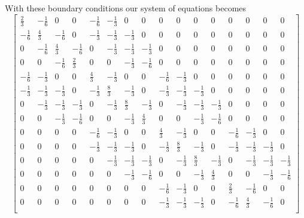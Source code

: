With these boundary conditions our system of equations becomes
\begin{equation}
  \begin{bmatrix}
  \frac{2}{3} & -\frac{1}{6} & 0 & 0 & -\frac{1}{6} & -\frac{1}{3} & 0 & 0 & 0 & 0 & 0 & 0 & 0 & 0 & 0 & 0 \\
  -\frac{1}{6} & \frac{4}{3} & -\frac{1}{6} & 0 & -\frac{1}{3} & -\frac{1}{3} & -\frac{1}{3} & 0 & 0 & 0 & 0 & 0 & 0 & 0 & 0 & 0 \\
  0 & -\frac{1}{6} & \frac{4}{3} & -\frac{1}{6} & 0 & -\frac{1}{3} & -\frac{1}{3} & -\frac{1}{3} & 0 & 0 & 0 & 0 & 0 & 0 & 0 & 0 \\
  0 & 0 & -\frac{1}{6} & \frac{2}{3} & 0 & 0 & -\frac{1}{3} & -\frac{1}{6} & 0 & 0 & 0 & 0 & 0 & 0 & 0 & 0 \\
  -\frac{1}{6} & -\frac{1}{3} & 0 & 0 & \frac{4}{3} & -\frac{1}{3} & 0 & 0 & -\frac{1}{6} & -\frac{1}{3} & 0 & 0 & 0 & 0 & 0 & 0 \\
  -\frac{1}{3} & -\frac{1}{3} & -\frac{1}{3} & 0 & -\frac{1}{3} & \frac{8}{3} & -\frac{1}{3} & 0 & -\frac{1}{3} & -\frac{1}{3} & -\frac{1}{3} & 0 & 0 & 0 & 0 & 0 \\
  0 & -\frac{1}{3} & -\frac{1}{3} & -\frac{1}{3} & 0 & -\frac{1}{3} & \frac{8}{3} & -\frac{1}{3} & 0 & -\frac{1}{3} & -\frac{1}{3} & -\frac{1}{3} & 0 & 0 & 0 & 0 \\
  0 & 0 & -\frac{1}{3} & -\frac{1}{6} & 0 & 0 & -\frac{1}{3} & \frac{4}{3} & 0 & 0 & -\frac{1}{3} & -\frac{1}{6} & 0 & 0 & 0 & 0 \\
  0 & 0 & 0 & 0 & -\frac{1}{6} & -\frac{1}{3} & 0 & 0 & \frac{4}{3} & -\frac{1}{3} & 0 & 0 & -\frac{1}{6} & -\frac{1}{3} & 0 & 0 \\
  0 & 0 & 0 & 0 & -\frac{1}{3} & -\frac{1}{3} & -\frac{1}{3} & 0 & -\frac{1}{3} & \frac{8}{3} & -\frac{1}{3} & 0 & -\frac{1}{3} & -\frac{1}{3} & -\frac{1}{3} & 0 \\
  0 & 0 & 0 & 0 & 0 & -\frac{1}{3} & -\frac{1}{3} & -\frac{1}{3} & 0 & -\frac{1}{3} & \frac{8}{3} & -\frac{1}{3} & 0 & -\frac{1}{3} & -\frac{1}{3} & -\frac{1}{3} \\
  0 & 0 & 0 & 0 & 0 & 0 & -\frac{1}{3} & -\frac{1}{6} & 0 & 0 & -\frac{1}{3} & \frac{4}{3} & 0 & 0 & -\frac{1}{3} & -\frac{1}{6} \\
  0 & 0 & 0 & 0 & 0 & 0 & 0 & 0 & -\frac{1}{6} & -\frac{1}{3} & 0 & 0 & \frac{2}{3} & -\frac{1}{6} & 0 & 0 \\
  0 & 0 & 0 & 0 & 0 & 0 & 0 & 0 & -\frac{1}{3} & -\frac{1}{3} & -\frac{1}{3} & 0 & -\frac{1}{6} & \frac{4}{3} & -\frac{1}{6} & 0 \\

\end{bmatrix}
\end{equation}
